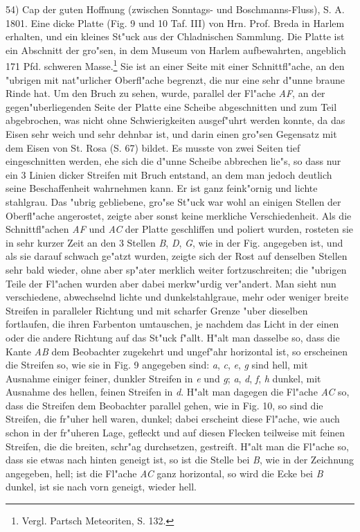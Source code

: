 \documentclass[a4paper, 11pt, oneside]{article}
\begin{document}
54) Cap der guten Hoffnung (zwischen Sonntags- und Boschmanns-Fluss), S. A. 1801. Eine dicke Platte (Fig. 9 und 10 Taf. III) von Hrn. Prof. Breda in Harlem erhalten, und ein kleines St"uck aus der Chladnischen Sammlung. Die Platte ist ein Abschnitt der gro"sen, in dem Museum von Harlem aufbewahrten, angeblich 171 Pfd. schweren Masse.\footnote{Vergl. Partsch Meteoriten, S. 132.} Sie ist an einer Seite mit einer Schnittfl"ache, an den "ubrigen mit nat"urlicher Oberfl"ache begrenzt, die nur eine sehr d"unne braune Rinde hat. Um den Bruch zu sehen, wurde, parallel der Fl"ache \emph{AF}, an der gegen"uberliegenden Seite der Platte eine Scheibe abgeschnitten und zum Teil abgebrochen, was nicht ohne Schwierigkeiten ausgef"uhrt werden konnte, da das Eisen sehr weich und sehr dehnbar ist, und darin einen gro"sen Gegensatz mit dem Eisen von St. Rosa (S. 67) bildet. Es musste von zwei Seiten tief eingeschnitten werden, ehe sich die d"unne Scheibe abbrechen lie"s, so dass nur ein 3 Linien dicker Streifen mit Bruch entstand, an dem man jedoch deutlich seine Beschaffenheit wahrnehmen kann. Er ist ganz feink"ornig und lichte stahlgrau. Das "ubrig gebliebene, gro"se St"uck war wohl an einigen Stellen der Oberfl"ache angerostet, zeigte aber sonst keine merkliche Verschiedenheit. Als die Schnittfl"achen \emph{AF} und \emph{AC} der Platte geschliffen und poliert wurden, rosteten sie in sehr kurzer Zeit an den 3 Stellen \emph{B}, \emph{D}, \emph{G}, wie in der Fig. angegeben ist, und als sie darauf schwach ge"atzt wurden, zeigte sich der Rost auf denselben Stellen sehr bald wieder, ohne aber sp"ater merklich weiter fortzuschreiten; die "ubrigen Teile der Fl"achen wurden aber dabei merkw"urdig ver"andert. Man sieht nun verschiedene, abwechselnd lichte und dunkelstahlgraue, mehr oder weniger breite Streifen in paralleler Richtung und mit scharfer Grenze "uber dieselben fortlaufen, die ihren Farbenton umtauschen, je nachdem das Licht in der einen oder die andere Richtung auf das St"uck f"allt. H"alt man dasselbe so, dass die Kante \emph{AB} dem Beobachter zugekehrt und ungef"ahr horizontal ist, so erscheinen die Streifen so, wie sie in Fig. 9 angegeben sind: \emph{a}, \emph{c}, \emph{e}, \emph{g} sind hell, mit Ausnahme einiger feiner, dunkler Streifen in \emph{e} und \emph{g}; \emph{a}, \emph{d}, \emph{f}, \emph{h} dunkel, mit Ausnahme des hellen, feinen Streifen in \emph{d}. H"alt man dagegen die Fl"ache \emph{AC} so, dass die Streifen dem Beobachter parallel gehen, wie in Fig. 10, so sind die Streifen, die fr"uher hell waren, dunkel; dabei erscheint diese Fl"ache, wie auch schon in der fr"uheren Lage, gefleckt und auf diesen Flecken teilweise mit feinen Streifen, die die breiten, schr"ag durchsetzen, gestreift. H"alt man die Fl"ache so, dass sie etwas nach hinten geneigt ist, so ist die Stelle bei \emph{B}, wie in der Zeichnung angegeben, hell; ist die Fl"ache \emph{AC} ganz horizontal, so wird die Ecke bei \emph{B} dunkel, ist sie nach vorn geneigt, wieder hell.
\end{document}
